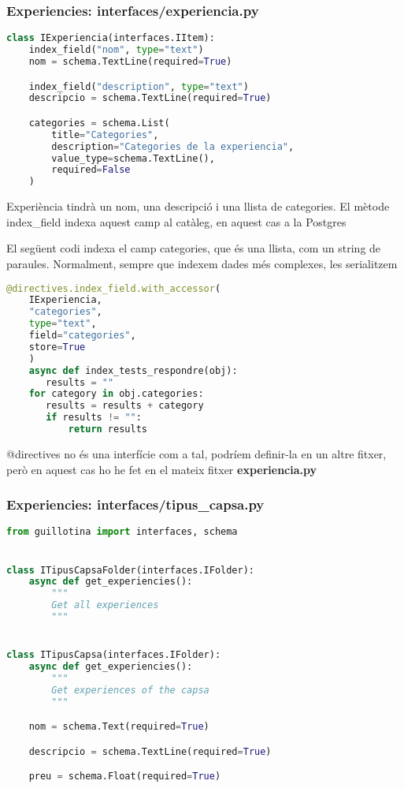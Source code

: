 \documentclass[a4paper, 11pt]{article}
\begin{document}
\subsubsection{Experiencies: interfaces/experiencia.py}
\begin{lstlisting}[language=Python, caption=Estructura dades]
  class IExperiencia(interfaces.IItem):
    index_field("nom", type="text")
    nom = schema.TextLine(required=True)

    index_field("description", type="text")
    descripcio = schema.TextLine(required=True)

    categories = schema.List(
        title="Categories",
        description="Categories de la experiencia",
        value_type=schema.TextLine(),
        required=False
    )
  \end{lstlisting}
  Experiència tindrà un nom, una descripció i una llista de
  categories. El mètode index\_field indexa aquest camp al catàleg, en
  aquest cas a la Postgres


  El següent codi indexa el camp categories, que és una llista, com un
  string de paraules. Normalment, sempre que indexem dades més
  complexes, les serialitzem
  \begin{lstlisting}[language=Python, caption=Estructura dades]
  @directives.index_field.with_accessor(
    IExperiencia,
    "categories",
    type="text",
    field="categories",
    store=True
    )
    async def index_tests_respondre(obj):
       results = ""
    for category in obj.categories:
       results = results + category
       if results != "":
           return results
         \end{lstlisting}
         @directives no és una interfície com a tal, podríem
         definir-la en un altre fitxer, però en aquest cas ho he fet
         en el mateix fitxer \textbf{experiencia.py}

\subsubsection{Experiencies: interfaces/tipus\_capsa.py}
    \begin{lstlisting}[language=Python, caption=Estructura dades]
  from guillotina import interfaces, schema


class ITipusCapsaFolder(interfaces.IFolder):
    async def get_experiencies():
        """
        Get all experiences
        """


class ITipusCapsa(interfaces.IFolder):
    async def get_experiencies():
        """
        Get experiences of the capsa
        """

    nom = schema.Text(required=True)

    descripcio = schema.TextLine(required=True)

    preu = schema.Float(required=True)
  \end{lstlisting}
\end{document}
